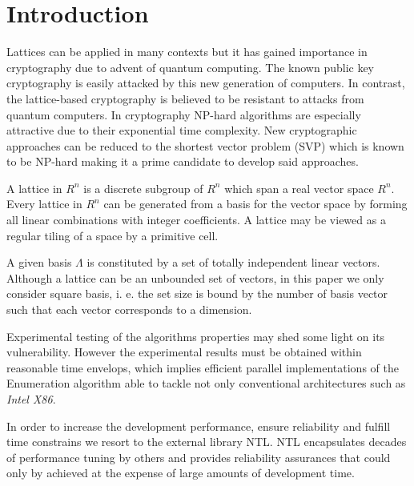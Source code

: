 \documentclass[conference]{IEEEtran}
\begin{document}
\IEEEpeerreviewmaketitle


\section{Introduction}

	Lattices can be applied in many contexts but it has gained importance in cryptography due to advent of quantum computing. The known public key cryptography is easily attacked by this new generation of computers. In contrast, the lattice-based cryptography is believed to be resistant to attacks from quantum computers. In cryptography NP-hard algorithms are especially attractive due to their exponential time complexity. New cryptographic approaches can be reduced to the shortest vector problem (SVP) which is known to be NP-hard making it a prime candidate to develop said approaches. 
	
	A lattice in $R^n$ is a discrete subgroup of $R^n$ which span a real vector space $R^n$. Every lattice in $R^n$ can be generated from a basis for the vector space by forming all linear combinations with integer coefficients. A lattice may be viewed as a regular tiling of a space by a primitive cell.
	
    A given basis $\Lambda$ is constituted by a set of totally independent linear vectors. Although a lattice can be an unbounded set  of vectors, in this paper we only consider square basis, i. e. the set size is bound by the number of basis vector such that each vector corresponds to a dimension.
    
    Experimental testing of the algorithms properties may shed some light on its vulnerability. However the experimental results must be obtained  within reasonable time envelops, which implies efficient parallel implementations of the Enumeration algorithm able to tackle not only conventional architectures such as \emph{Intel X86}.

    In order to increase the development performance, ensure reliability and fulfill time constrains we resort to the external library NTL. NTL encapsulates decades of performance tuning by others and provides reliability assurances that could only by achieved at the expense of large amounts of development time.
    
\end{document}
